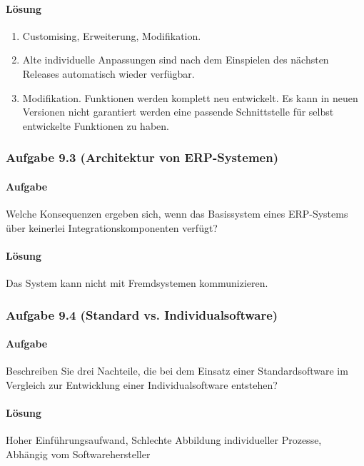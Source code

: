     \paragraph*{Lösung}
        \begin{enumerate}[label=\alph*)]
            \item Customising, Erweiterung, Modifikation.
            \item Alte individuelle Anpassungen sind nach dem Einspielen des nächsten Releases automatisch wieder verfügbar.
            \item Modifikation. Funktionen werden komplett neu entwickelt. Es kann in neuen Versionen nicht garantiert werden eine passende Schnittstelle für selbst entwickelte Funktionen zu haben.
        \end{enumerate}

\subsubsection*{Aufgabe 9.3 (Architektur von ERP-Systemen)}
    \paragraph*{Aufgabe}
        Welche Konsequenzen ergeben sich, wenn das Basissystem eines ERP-Systems über keinerlei
        Integrationskomponenten verfügt?
    \paragraph*{Lösung}
        Das System kann nicht mit Fremdsystemen kommunizieren.

\subsubsection*{Aufgabe 9.4 (Standard vs. Individualsoftware)}
    \paragraph*{Aufgabe}
        Beschreiben Sie drei Nachteile, die bei dem Einsatz einer Standardsoftware im Vergleich zur
        Entwicklung einer Individualsoftware entstehen?
    \paragraph*{Lösung}
        Hoher Einführungsaufwand, Schlechte Abbildung individueller Prozesse, Abhängig vom Softwarehersteller
    
